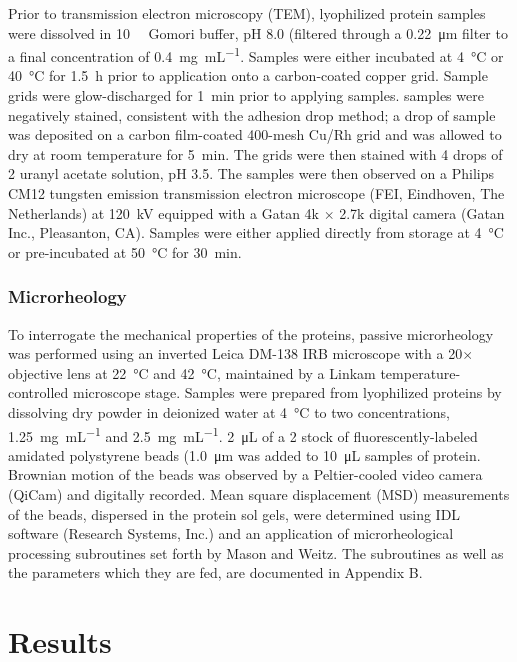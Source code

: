 \begin{refsection}
Prior to transmission electron microscopy (TEM), lyophilized protein samples
were dissolved in \SI{10}{\milli\moLar} Gomori buffer, pH 8.0 (filtered through
a \SI{0.22}{\um} filter to a final concentration of \SI{0.4}{\mg\per\mL}.
Samples were either incubated at \SI{4}{\celsius} or \SI{40}{\celsius} for
\SI{1.5}{\hour} prior to application onto a carbon-coated copper grid. Sample
grids were glow-discharged for \SI{1}{\minute} prior to applying samples.
samples were negatively stained, consistent with the adhesion drop method; a
drop of sample was deposited on a carbon film-coated 400-mesh Cu/Rh grid and was
allowed to dry at room temperature for \SI{5}{\minute}. The grids were then
stained with 4 drops of \SI{2}{\volper} uranyl acetate solution, pH 3.5. The
samples were then observed on a Philips CM12 tungsten emission transmission
electron microscope (FEI, Eindhoven, The Netherlands) at \SI{120}{\kV} equipped
with a Gatan 4k ${\times}$ 2.7k digital camera (Gatan Inc., Pleasanton, CA).
Samples were either applied directly from storage at \SI{4}{\celsius} or
pre-incubated at \SI{50}{\celsius} for \SI{30}{\minute}.

\subsubsection{Microrheology}

To interrogate the mechanical properties of the proteins, passive microrheology
was performed using an inverted Leica DM-138 IRB microscope with a 20$\times$
objective lens at \SI{22}{\celsius} and \SI{42}{\celsius}, maintained by a
Linkam temperature-controlled microscope stage. Samples were prepared from
lyophilized proteins by dissolving dry powder in deionized water at
\SI{4}{\celsius} to two concentrations, \SI{1.25}{\mg\per\mL} and
\SI{2.5}{\mg\per\mL}. \SI{2}{\uL} of a \SI{2}{\wtper} stock of
fluorescently-labeled amidated polystyrene beads (\SI{1.0}{\um} was added to
\SI{10}{\uL} samples of protein. Brownian motion of the beads was observed by a
Peltier-cooled video camera (QiCam) and digitally recorded.  Mean square
displacement (MSD) measurements of the beads, dispersed in the protein sol gels,
were determined using IDL software (Research Systems, Inc.) and an application
of microrheological processing subroutines set forth by Mason and
Weitz.\cite{Mason1997} The subroutines as well as the parameters which they are
fed, are documented in Appendix B. 

\section{Results}


\end{refsection}
